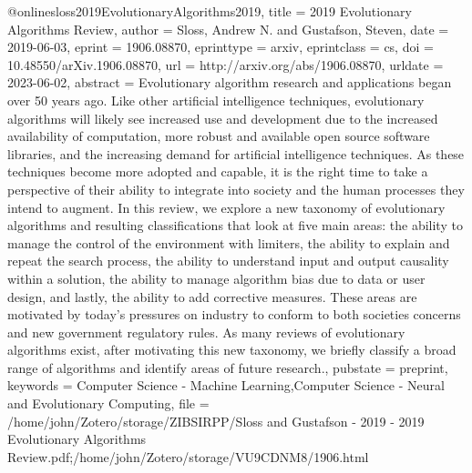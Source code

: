 \begin{thebibliography}
@online{sloss2019EvolutionaryAlgorithms2019,
  title = {2019 {{Evolutionary Algorithms Review}}},
  author = {Sloss, Andrew N. and Gustafson, Steven},
  date = {2019-06-03},
  eprint = {1906.08870},
  eprinttype = {arxiv},
  eprintclass = {cs},
  doi = {10.48550/arXiv.1906.08870},
  url = {http://arxiv.org/abs/1906.08870},
  urldate = {2023-06-02},
  abstract = {Evolutionary algorithm research and applications began over 50 years ago. Like other artificial intelligence techniques, evolutionary algorithms will likely see increased use and development due to the increased availability of computation, more robust and available open source software libraries, and the increasing demand for artificial intelligence techniques. As these techniques become more adopted and capable, it is the right time to take a perspective of their ability to integrate into society and the human processes they intend to augment. In this review, we explore a new taxonomy of evolutionary algorithms and resulting classifications that look at five main areas: the ability to manage the control of the environment with limiters, the ability to explain and repeat the search process, the ability to understand input and output causality within a solution, the ability to manage algorithm bias due to data or user design, and lastly, the ability to add corrective measures. These areas are motivated by today's pressures on industry to conform to both societies concerns and new government regulatory rules. As many reviews of evolutionary algorithms exist, after motivating this new taxonomy, we briefly classify a broad range of algorithms and identify areas of future research.},
  pubstate = {preprint},
  keywords = {Computer Science - Machine Learning,Computer Science - Neural and Evolutionary Computing},
  file = {/home/john/Zotero/storage/ZIBSIRPP/Sloss and Gustafson - 2019 - 2019 Evolutionary Algorithms Review.pdf;/home/john/Zotero/storage/VU9CDNM8/1906.html}
}


\end{thebibliography}
